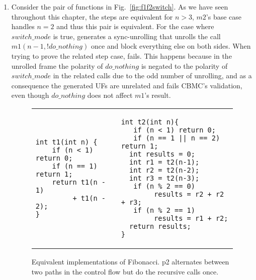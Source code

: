 \begin{enumerate}
	\item 
Consider the pair of functions in Fig.~\ref{fig:f1f2switch}. As we have seen throughout this chapter, the steps are equivalent for $n > 3$, $m2$'s base case handles $n=2$ and thus this pair is equivalent. For the case where $switch\_mode$ is true,  generates a sync-unrolling that unrolls the call $m1(n-1,!do\_nothing)$ once and block everything else on both sides. When trying to prove the related step case,  fails. This happens because in the unrolled frame the polarity of $do\_nothing$ is negated to the polarity of $switch\_mode$ in the related calls due to the odd number of unrolling, and as a consequence the generated UFs are unrelated and fails CBMC's validation, even though $do\_nothing$ does not affect $m1$'s result. 


\begin{figure}[h]
\begin{center}
	\begin{tabular}{ll}
\begin{minipage}[t][5cm]{5.5 cm}
\begin{lstlisting}
int t1(int n) {
    if (n < 1) return 0;
    if (n == 1) return 1;
    return t1(n - 1) 
         + t1(n - 2);
}
\end{lstlisting}
\end{minipage} & 
\begin{minipage}[t][5cm]{7 cm}
\begin{lstlisting}
int t2(int n){
   if (n < 1) return 0;
   if (n == 1 || n == 2) return 1; 
  int results = 0;
  int r1 = t2(n-1);
  int r2 = t2(n-2);
  int r3 = t2(n-3);
   if (n % 2 == 0)
        results = r2 + r2 + r3;
   if (n % 2 == 1)
        results = r1 + r2;
  return results;
}
\end{lstlisting}
\end{minipage}
\end{tabular}
\caption{Equivalent implementations of Fibonacci. p2 alternates between two paths in the control flow but do the recursive calls once.}
\label{fig:redundentcalls}
\end{center}
\end{figure}


\end{enumerate}
